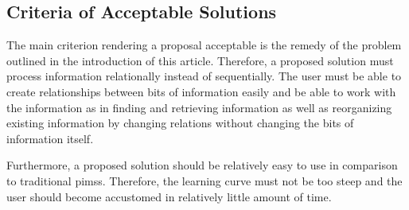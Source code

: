 \subsection{Criteria of Acceptable Solutions}

The main criterion rendering a proposal acceptable is the remedy of the problem
outlined in the introduction of this article. Therefore, a proposed solution
must process information relationally instead of sequentially. The user must be
able to create relationships between bits of information easily and be able to
work with the information as in finding and retrieving information as well as
reorganizing existing information by changing relations without changing the
bits of information itself.

\iffalse
Relations -< verknüpfung (wort) unverständlich
\fi

Furthermore, a proposed solution should be relatively easy to use in comparison
to traditional \glspl{pims}. Therefore, the learning curve must not be too
steep and the user should become accustomed in relatively little amount of time.

\iffalse
Beispiel für diesen Use-Case
\fi
